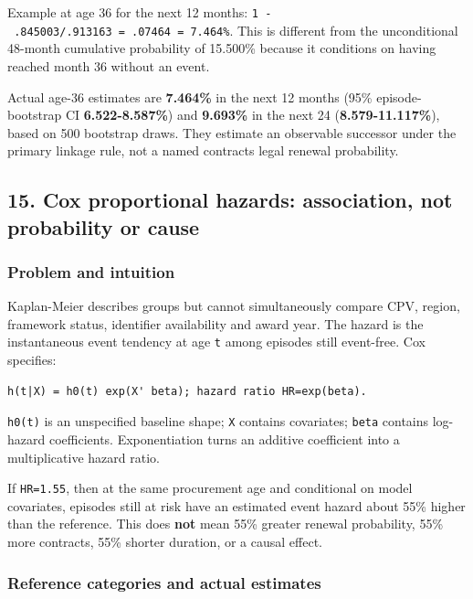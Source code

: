 Example at age 36 for the next 12 months:
\texttt{1\ -\ .845003/.913163\ =\ .07464\ =\ 7.464\%}. This is different
from the unconditional 48-month cumulative probability of 15.500\%
because it conditions on having reached month 36 without an event.

Actual age-36 estimates are \textbf{7.464\%} in the next 12 months (95\%
episode-bootstrap CI \textbf{6.522-8.587\%}) and \textbf{9.693\%} in the
next 24 (\textbf{8.579-11.117\%}), based on 500 bootstrap draws. They
estimate an observable successor under the primary linkage rule, not a
named contract\textquotesingle s legal renewal probability.

\subsection{15. Cox proportional hazards: association, not probability
or
cause}\label{15-cox-proportional-hazards-association-not-probability-or-cause}

\subsubsection{Problem and intuition}\label{problem-and-intuition}

Kaplan-Meier describes groups but cannot simultaneously compare CPV,
region, framework status, identifier availability and award year. The
hazard is the instantaneous event tendency at age \texttt{t} among
episodes still event-free. Cox specifies:

\begin{verbatim}
h(t|X) = h0(t) exp(X' beta); hazard ratio HR=exp(beta).
\end{verbatim}

\texttt{h0(t)} is an unspecified baseline shape; \texttt{X} contains
covariates; \texttt{beta} contains log-hazard coefficients.
Exponentiation turns an additive coefficient into a multiplicative
hazard ratio.

If \texttt{HR=1.55}, then at the same procurement age and conditional on
model covariates, episodes still at risk have an estimated event hazard
about 55\% higher than the reference. This does \textbf{not} mean 55\%
greater renewal probability, 55\% more contracts, 55\% shorter duration,
or a causal effect.

\subsubsection{Reference categories and actual
estimates}\label{reference-categories-and-actual-estimates}

